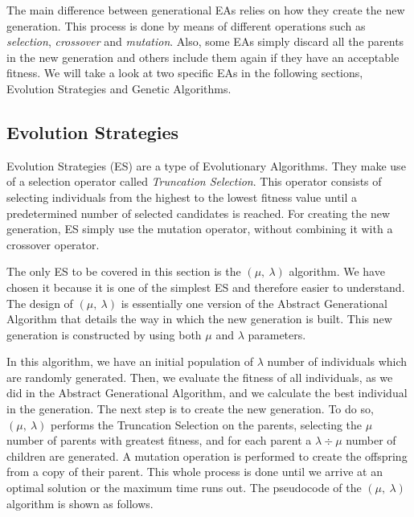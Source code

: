 The main difference between generational EAs relies on how they create the new generation. This process is done by means of different operations such as \textit{selection}, \textit{crossover} and \textit{mutation}. Also, some EAs simply discard all the parents in the new generation and others include them again if they have an acceptable fitness. We will take a look at two specific EAs in the following sections, Evolution Strategies and Genetic Algorithms.


\subsection{Evolution Strategies}

Evolution Strategies (ES) \cite{luke13metaheuristics} are a type of Evolutionary Algorithms. They make use of a selection operator called \textit{Truncation Selection}. This operator consists of selecting individuals from the highest to the lowest fitness value until a predetermined number of selected candidates is reached. For creating the new generation, ES simply use the mutation operator, without combining it with a crossover operator.

The only ES to be covered in this section is the $(\mu,\ \lambda)$ algorithm. We have chosen it because it is one of the simplest ES and therefore easier to understand. The design of $(\mu,\ \lambda)$ is essentially one version of the Abstract Generational Algorithm that details the way in which the new generation is built. This new generation is constructed by using both $\mu$ and $\lambda$ parameters.

In this algorithm, we have an initial population of $\lambda$ number of individuals which are randomly generated. Then, we evaluate the fitness of all individuals, as we did in the Abstract Generational Algorithm, and we calculate the best individual in the generation. The next step is to create the new generation. To do so, $(\mu,\ \lambda)$ performs the Truncation Selection on the parents, selecting the $\mu$ number of parents with greatest fitness, and for each parent a $\lambda \div \mu$ number of children are generated. A mutation operation is performed to create the offspring from a copy of their parent. This whole process is done until we arrive at an optimal solution or the maximum time runs out. The pseudocode of the $(\mu,\ \lambda)$ algorithm is shown as follows.

